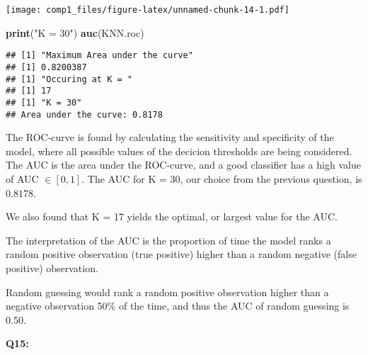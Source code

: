 \documentclass[]{article}
\newenvironment{Shaded}{\begin{snugshade}}{\end{snugshade}}
\newcommand{\KeywordTok}[1]{\textcolor[rgb]{0.13,0.29,0.53}{\textbf{#1}}}
\newcommand{\StringTok}[1]{\textcolor[rgb]{0.31,0.60,0.02}{#1}}
\newcommand{\NormalTok}[1]{#1}
\begin{document}
\texttt{[image: comp1\_files/figure-latex/unnamed-chunk-14-1.pdf]}

\begin{Shaded}
\begin{Highlighting}[]
\KeywordTok{print}\NormalTok{(}\StringTok{"K = 30"}\NormalTok{)}
\KeywordTok{auc}\NormalTok{(KNN.roc)}
\end{Highlighting}
\end{Shaded}

\begin{verbatim}
## [1] "Maximum Area under the curve"
## [1] 0.8200387
## [1] "Occuring at K = "
## [1] 17
## [1] "K = 30"
## Area under the curve: 0.8178
\end{verbatim}

The ROC-curve is found by calculating the sensitivity and specificity of
the model, where all possible values of the decicion thresholds are
being considered. The AUC is the area under the ROC-curve, and a good
classifier has a high value of AUC \(\in[0,1]\). The AUC for K = 30, our
choice from the previous question, is \(0.8178\).

We also found that K = 17 yields the optimal, or largest value for the
AUC.

The interpretation of the AUC is the proportion of time the model ranks
a random positive observation (true positive) higher than a random
negative (false positive) observation.

Random guessing would rank a random positive observation higher than a
negative observation 50\% of the time, and thus the AUC of random
guessing is 0.50.

\textbf{Q15:}
\end{document}
